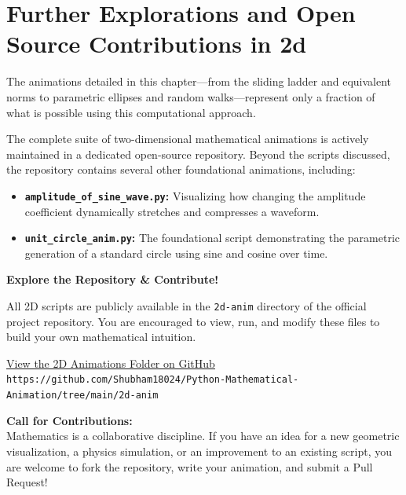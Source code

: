 \documentclass[12pt, a4paper]{report}
\begin{document}
\newpage
\section{Further Explorations and Open Source Contributions in 2d}

The animations detailed in this chapter—from the sliding ladder and equivalent norms to parametric ellipses and random walks—represent only a fraction of what is possible using this computational approach. 

The complete suite of two-dimensional mathematical animations is actively maintained in a dedicated open-source repository. Beyond the scripts discussed, the repository contains several other foundational animations, including:
\begin{itemize}
    \item \textbf{\texttt{amplitude\_of\_sine\_wave.py}:} Visualizing how changing the amplitude coefficient dynamically stretches and compresses a waveform.
    \item \textbf{\texttt{unit\_circle\_anim.py}:} The foundational script demonstrating the parametric generation of a standard circle using sine and cosine over time.
\end{itemize}

\vspace{0.5cm}
\begin{mdframed}[backgroundcolor=gray!10, linecolor=black, linewidth=1pt, roundcorner=5pt]
    \centering
    \textbf{Explore the Repository \& Contribute!} \\
    \vspace{0.3cm}
    \raggedright
    All 2D scripts are publicly available in the \texttt{2d-anim} directory of the official project repository. You are encouraged to view, run, and modify these files to build your own mathematical intuition.
    
    \vspace{0.3cm}
    \centering
    \href{https://github.com/Shubham18024/Python-Mathematical-Animation/tree/main/2d-anim}{
        \color{blue}\underline{View the 2D Animations Folder on GitHub}
    } \\
    \vspace{0.1cm}
    \scriptsize \texttt{https://github.com/Shubham18024/Python-Mathematical-Animation/tree/main/2d-anim}
    
    \vspace{0.4cm}
    \raggedright
    \textbf{Call for Contributions:} \\
    Mathematics is a collaborative discipline. If you have an idea for a new geometric visualization, a physics simulation, or an improvement to an existing script, you are welcome to fork the repository, write your animation, and submit a Pull Request!
\end{mdframed}
\vspace{0.5cm}
\newpage
\newpage
\end{document}
